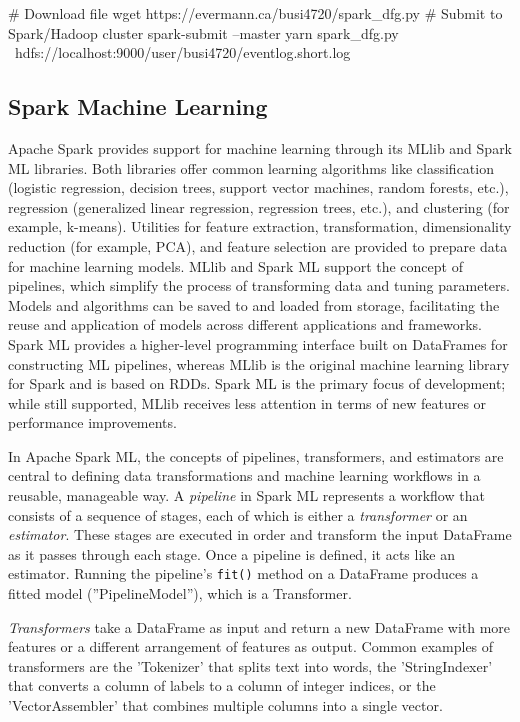 \begin{bashcode}
# Download file
wget https://evermann.ca/busi4720/spark_dfg.py
# Submit to Spark/Hadoop cluster
spark-submit --master yarn spark_dfg.py \
 hdfs://localhost:9000/user/busi4720/eventlog.short.log
\end{bashcode}

\subsection{Spark Machine Learning}

Apache Spark provides support for machine learning through its MLlib and Spark ML libraries. Both libraries offer common learning algorithms like classification (logistic regression, decision trees, support vector machines, random forests, etc.), regression (generalized linear regression, regression trees, etc.), and clustering (for example, k-means). Utilities for feature extraction, transformation, dimensionality reduction (for example, PCA), and feature selection are provided to prepare data for machine learning models. MLlib and Spark ML support the concept of pipelines, which simplify the process of transforming data and tuning parameters. Models and algorithms can be saved to and loaded from storage, facilitating the reuse and application of models across different applications and frameworks. Spark ML provides a higher-level programming interface built on DataFrames for constructing ML pipelines, whereas MLlib is the original machine learning library for Spark and is based on RDDs. Spark ML is the primary focus of development; while still supported, MLlib receives less attention in terms of new features or performance improvements.

In Apache Spark ML, the concepts of pipelines, transformers, and estimators are central to defining data transformations and machine learning workflows in a reusable, manageable way. A \emph{pipeline} in Spark ML represents a workflow that consists of a sequence of stages, each of which is either a \emph{transformer} or an \emph{estimator}. These stages are executed in order and transform the input DataFrame as it passes through each stage. Once a pipeline is defined, it acts like an estimator. Running the pipeline's \texttt{fit()} method on a DataFrame produces a fitted model (''PipelineModel''), which is a Transformer.

\emph{Transformers} take a DataFrame as input and return a new DataFrame with more features or a different arrangement of features as output. Common examples of transformers are the 'Tokenizer' that splits text into words, the 'StringIndexer' that converts a column of labels to a column of integer indices, or the 'VectorAssembler' that combines multiple columns into a single vector.

